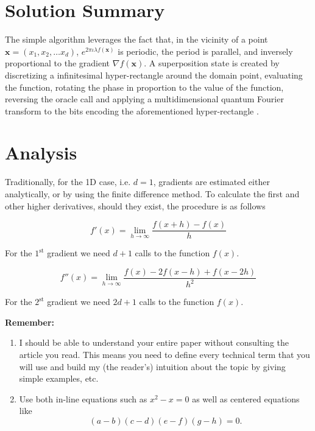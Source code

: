 \documentclass{article}
\begin{document}
\section{Solution Summary}


The simple algorithm leverages the fact that, in the vicinity of a point \(\mathbf{x} = (x_1, x_2, \ldots x_d)\),
\(e^{2 \pi \iota \lambda f(\mathbf{x})}\) is periodic, the period is parallel, and inversely
proportional to the gradient \(\nabla f(\mathbf{x})\). A superposition state is created by
discretizing a infinitesimal hyper-rectangle around the domain point, evaluating the function,
rotating the phase in proportion to the value of the function, reversing the oracle call and
applying a multidimensional quantum Fourier transform to the bits encoding the aforementioned
hyper-rectangle \cite{quant-ph/0507109}.

\section{Analysis}

Traditionally, for the 1D case, i.e. \(d = 1\), gradients are estimated either analytically, or by
using the finite difference method. To calculate the first and other higher derivatives,
should they exist, the procedure is as follows

\begin{equation}
  f'(x) =  \lim_{h \to \infty} \frac{f(x + h) - f(x)}{h}
\end{equation}

For the \(1^{\text{st}}\) gradient we need  \(d + 1\) calls to the function \(f(x)\).


\begin{equation}
  f''(x) =  \lim_{h \to \infty} \frac{f(x) - 2f(x - h) + f(x - 2h)}{h^2}
\end{equation}

For the \(2^{\text{st}}\) gradient we need  \(2d + 1\) calls to the function \(f(x)\).




\textbf{Remember:}

\begin{enumerate}
  \item I should be able to understand your entire paper without consulting the article you read. This means you need to define every technical term that you will use and build my (the reader's) intuition about the topic by giving simple examples, etc.
  \item Use both in-line equations such as $x^2-x=0$ as well as centered equations like
        $$(a-b)(c-d)(e-f)(g-h)=0.$$
\end{enumerate}
\end{document}
